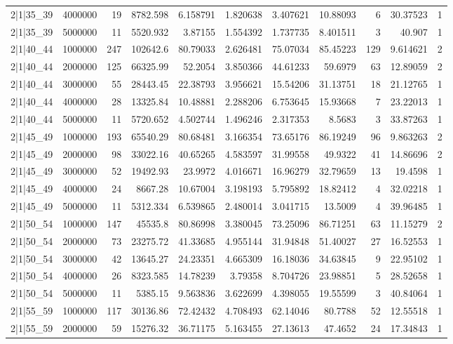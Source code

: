 \begin{tabular}{lrrrrrrrrrr}
2|1|35\_39 & 4000000 & 19 & 8782.598 & 6.158791 & 1.820638 & 3.407621 & 10.88093 & 6 & 30.37523 & 1 \\
2|1|35\_39 & 5000000 & 11 & 5520.932 & 3.87155 & 1.554392 & 1.737735 & 8.401511 & 3 & 40.907 & 1 \\
2|1|40\_44 & 1000000 & 247 & 102642.6 & 80.79033 & 2.626481 & 75.07034 & 85.45223 & 129 & 9.614621 & 2 \\
2|1|40\_44 & 2000000 & 125 & 66325.99 & 52.2054 & 3.850366 & 44.61233 & 59.6979 & 63 & 12.89059 & 2 \\
2|1|40\_44 & 3000000 & 55 & 28443.45 & 22.38793 & 3.956621 & 15.54206 & 31.13751 & 18 & 21.12765 & 1 \\
2|1|40\_44 & 4000000 & 28 & 13325.84 & 10.48881 & 2.288206 & 6.753645 & 15.93668 & 7 & 23.22013 & 1 \\
2|1|40\_44 & 5000000 & 11 & 5720.652 & 4.502744 & 1.496246 & 2.317353 & 8.5683 & 3 & 33.87263 & 1 \\
2|1|45\_49 & 1000000 & 193 & 65540.29 & 80.68481 & 3.166354 & 73.65176 & 86.19249 & 96 & 9.863263 & 2 \\
2|1|45\_49 & 2000000 & 98 & 33022.16 & 40.65265 & 4.583597 & 31.99558 & 49.9322 & 41 & 14.86696 & 2 \\
2|1|45\_49 & 3000000 & 52 & 19492.93 & 23.9972 & 4.016671 & 16.96279 & 32.79659 & 13 & 19.4598 & 1 \\
2|1|45\_49 & 4000000 & 24 & 8667.28 & 10.67004 & 3.198193 & 5.795892 & 18.82412 & 4 & 32.02218 & 1 \\
2|1|45\_49 & 5000000 & 11 & 5312.334 & 6.539865 & 2.480014 & 3.041715 & 13.5009 & 4 & 39.96485 & 1 \\
2|1|50\_54 & 1000000 & 147 & 45535.8 & 80.86998 & 3.380045 & 73.25096 & 86.71251 & 63 & 11.15279 & 2 \\
2|1|50\_54 & 2000000 & 73 & 23275.72 & 41.33685 & 4.955144 & 31.94848 & 51.40027 & 27 & 16.52553 & 1 \\
2|1|50\_54 & 3000000 & 42 & 13645.27 & 24.23351 & 4.665309 & 16.18036 & 34.63845 & 9 & 22.95102 & 1 \\
2|1|50\_54 & 4000000 & 26 & 8323.585 & 14.78239 & 3.79358 & 8.704726 & 23.98851 & 5 & 28.52658 & 1 \\
2|1|50\_54 & 5000000 & 11 & 5385.15 & 9.563836 & 3.622699 & 4.398055 & 19.55599 & 3 & 40.84064 & 1 \\
2|1|55\_59 & 1000000 & 117 & 30136.86 & 72.42432 & 4.708493 & 62.14046 & 80.7788 & 52 & 12.55518 & 1 \\
2|1|55\_59 & 2000000 & 59 & 15276.32 & 36.71175 & 5.163455 & 27.13613 & 47.4652 & 24 & 17.34843 & 1 \\

\end{tabular}
